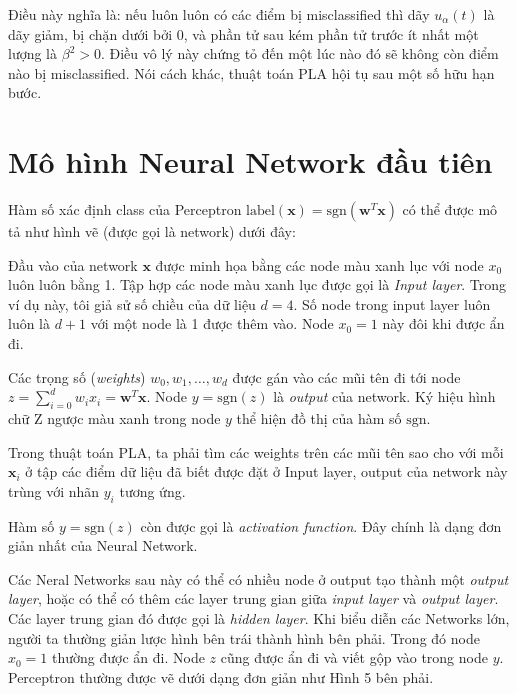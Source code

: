 Điều này nghĩa là: nếu luôn luôn có các điểm bị misclassified thì dãy $u_{\alpha}(t)$ là dãy giảm, bị chặn dưới bởi 0, và phần tử sau kém phần tử trước ít nhất một lượng là $\beta^2>0$. Điều vô lý này chứng tỏ đến một lúc nào đó sẽ không còn điểm nào bị misclassified. Nói cách khác, thuật toán PLA hội tụ sau một số hữu hạn bước.  
 
 
\section{Mô hình Neural Network đầu tiên}
Hàm số xác định class của Perceptron $\text{label}(\mathbf{x}) = \text{sgn}(\mathbf{w}^T\mathbf{x})$ có thể được mô tả như hình vẽ (được gọi là network) dưới đây: 
 
 
Đầu vào của network $\mathbf{x}$ được minh họa bằng các node màu xanh lục với node $x_0$ luôn luôn bằng 1. Tập hợp các node màu xanh lục được gọi là \textit{Input layer}. Trong ví dụ này, tôi giả sử số chiều của dữ liệu $d = 4$. Số node trong input layer luôn luôn là $d + 1$ với một node là 1 được thêm vào. Node $x_0 = 1$ này đôi khi được ẩn đi.  
 
Các trọng số (\textit{weights}) $w_0, w_1, \dots, w_d$ được gán vào các mũi tên đi tới node $\displaystyle z = \sum_{i=0}^dw_ix_i = \mathbf{w}^T\mathbf{x}$. Node $y = \text{sgn}(z)$ là \textit{output} của network. Ký hiệu hình chữ Z ngược màu xanh trong node $y$ thể hiện đồ thị của hàm số $\text{sgn}$.  
 
Trong thuật toán PLA, ta phải tìm các weights trên các mũi tên sao cho với mỗi $\mathbf{x}_i$ ở tập các điểm dữ liệu đã biết được đặt ở Input layer, output của network này trùng với nhãn $y_i$ tương ứng.  
 
Hàm số $y = \text{sgn}(z)$ còn được gọi là \textit{activation function}. Đây chính là dạng đơn giản nhất của Neural Network. 
 
 
Các Neral Networks sau này có thể có nhiều node ở output tạo thành một \textit{output layer}, hoặc có thể có thêm các layer trung gian giữa \textit{input layer} và \textit{output layer}. Các layer trung gian đó được gọi là \textit{hidden layer}. Khi biểu diễn các Networks lớn, người ta thường giản lược hình bên trái thành hình bên phải. Trong đó node $x_0 = 1$ thường được ẩn đi. Node $z$ cũng được ẩn đi và viết gộp vào trong node $y$. Perceptron thường được vẽ dưới dạng đơn giản như Hình 5 bên phải.  
 
